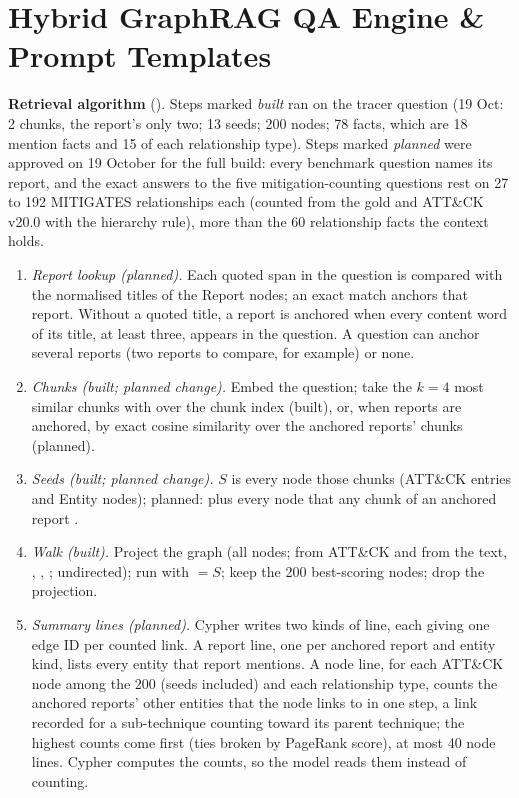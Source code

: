 \documentclass[10pt]{article}
\begin{document}
\section{Hybrid GraphRAG QA Engine \& Prompt Templates}
\textbf{Retrieval algorithm} (). Steps marked \emph{built} ran on the tracer question (19 Oct: 2 chunks, the report's only two; 13 seeds; 200 nodes; 78 facts, which are 18 mention facts and 15 of each relationship type). Steps marked \emph{planned} were approved on 19 October for the full build: every benchmark question names its report, and the exact answers to the five mitigation-counting questions rest on 27 to 192 MITIGATES relationships each (counted from the gold and ATT\&CK v20.0 with the hierarchy rule), more than the 60 relationship facts the context holds.
\begin{enumerate}
\item \emph{Report lookup (planned).} Each quoted span in the question is compared with the normalised titles of the Report nodes; an exact match anchors that report. Without a quoted title, a report is anchored when every content word of its title, at least three, appears in the question. A question can anchor several reports (two reports to compare, for example) or none.
\item \emph{Chunks (built; planned change).} Embed the question; take the $k = 4$ most similar chunks with  over the chunk index (built), or, when reports are anchored, by exact cosine similarity over the anchored reports' chunks (planned).
\item \emph{Seeds (built; planned change).} $S$ is every node those chunks  (ATT\&CK entries and Entity nodes); planned: plus every node that any chunk of an anchored report .
\item \emph{Walk (built).} Project the graph (all nodes;  from ATT\&CK and from the text, , , ; undirected); run  with  $= S$; keep the 200 best-scoring nodes; drop the projection.
\item \emph{Summary lines (planned).} Cypher writes two kinds of line, each giving one edge ID per counted link. A report line, one per anchored report and entity kind, lists every entity that report mentions. A node line, for each ATT\&CK node among the 200 (seeds included) and each relationship type, counts the anchored reports' other entities that the node links to in one step, a link recorded for a sub-technique counting toward its parent technique; the highest counts come first (ties broken by PageRank score), at most 40 node lines. Cypher computes the counts, so the model reads them instead of counting.

\end{enumerate}
\end{document}
